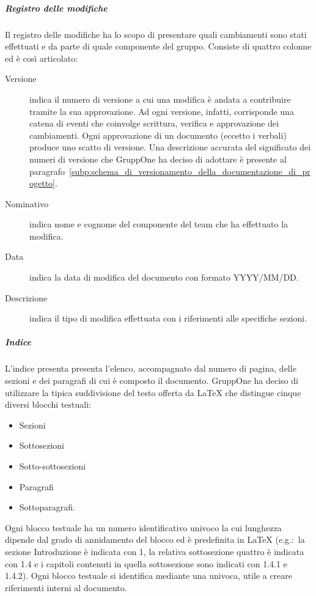 \documentclass[../../norme-di-progetto.tex]{subfiles}
\begin{document}
\subparagraph{Registro delle modifiche}%
\label{subp:registro_delle_modifiche}
Il registro delle modifiche ha lo scopo di presentare quali cambiamenti sono stati effettuati e da parte di quale componente del gruppo. Consiste di quattro colonne ed è così articolato:
\begin{description}
  \item [Versione] indica il numero di versione a cui una modifica è andata a contribuire tramite la sua approvazione.
        Ad ogni versione, infatti, corrisponde una catena di eventi che coinvolge scrittura, verifica e approvazione dei cambiamenti.
        Ogni approvazione di un documento (eccetto i verbali) produce uno scatto di versione.
        Una descrizione accurata del significato dei numeri di versione che GruppOne ha deciso di adottare è presente al paragrafo~\ref{subp:schema_di_versionamento_della_documentazione_di_progetto}.
  \item [Nominativo] indica nome e cognome del componente del team che ha effettuato la modifica.
  \item [Data] indica la data di modifica del documento con formato YYYY/MM/DD\@.
  \item [Descrizione] indica il tipo di modifica effettuata con i riferimenti alle specifiche sezioni.
\end{description}

\subparagraph{Indice}%
\label{subp:indice}
L'indice presenta presenta l'elenco, accompagnato dal numero di pagina, delle sezioni e dei paragrafi di cui è composto il documento.
GruppOne ha deciso di utilizzare la tipica suddivisione del testo offerta da \LaTeX{} che distingue cinque diversi blocchi testuali:
\begin{itemize}
  \item Sezioni
  \item Sottosezioni
  \item Sotto-sottosezioni
  \item Paragrafi
  \item Sottoparagrafi.
\end{itemize}

Ogni blocco testuale ha un numero identificativo univoco la cui lunghezza dipende dal grado di annidamento del blocco ed è predefinita in \LaTeX{} (e.g.:\ la sezione Introduzione è indicata con 1, la relativa sottosezione quattro è indicata con 1.4 e i capitoli contenuti in quella sottosezione sono indicati con 1.4.1 e 1.4.2).
Ogni blocco testuale si identifica mediante una  univoca, utile a creare riferimenti interni al documento.
\end{document}

